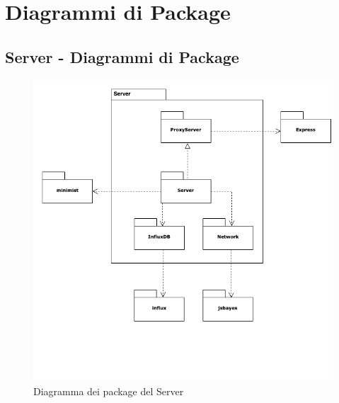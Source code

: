 \section{Diagrammi di Package}

\subsection{Server - Diagrammi di Package}
\begin{figure}[H]
	\begin{center}
		\includegraphics[scale=0.55]{./images/serverPackage.png} 
	\end{center}
	\caption{Diagramma dei package del Server}
\end{figure}



